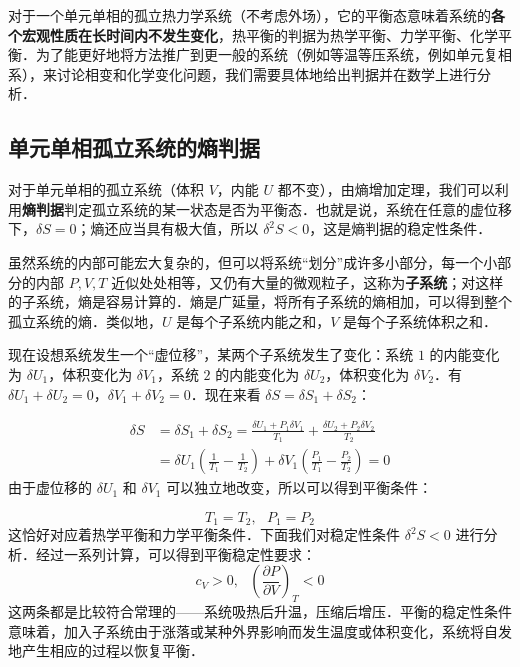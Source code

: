 
对于一个单元单相的孤立热力学系统（不考虑外场），它的平衡态意味着系统的\textbf{各个宏观性质在长时间内不发生变化}，热平衡的判据为热学平衡、力学平衡、化学平衡．为了能更好地将方法推广到更一般的系统（例如等温等压系统，例如单元复相系），来讨论相变和化学变化问题，我们需要具体地给出判据并在数学上进行分析．

\subsection{单元单相孤立系统的熵判据}

对于单元单相的孤立系统（体积 $V$，内能 $U$ 都不变），由熵增加定理，我们可以利用\textbf{熵判据}判定孤立系统的某一状态是否为平衡态．也就是说，系统在任意的虚位移下，$\delta S=0$；熵还应当具有极大值，所以 $\delta^2S<0$，这是熵判据的稳定性条件．

虽然系统的内部可能宏大复杂的，但可以将系统“划分”成许多小部分，每一个小部分的内部 $P,V,T$ 近似处处相等，又仍有大量的微观粒子，这称为\textbf{子系统}；对这样的子系统，熵是容易计算的．熵是广延量，将所有子系统的熵相加，可以得到整个孤立系统的熵．类似地，$U$ 是每个子系统内能之和，$V$ 是每个子系统体积之和．

现在设想系统发生一个“虚位移”，某两个子系统发生了变化：系统 $1$ 的内能变化为 $\delta U_1$，体积变化为 $\delta V_1$，系统 $2$ 的内能变化为 $\delta U_2$，体积变化为 $\delta V_2$．有 $\delta U_1+\delta U_2=0$，$\delta V_1+\delta V_2=0$．现在来看 $\delta S=\delta S_1+\delta S_2$：

\begin{align}
\delta S&=\delta S_1+\delta S_2=\frac{\delta U_1+P_1\delta V_1}{T_1}+\frac{\delta U_2+P_2\delta V_2}{T_2}
\\
&=\delta U_1\left(\frac{1}{T_1}-\frac{1}{T_2}\right)
+\delta V_1\left(\frac{P_1}{T_1}-\frac{P_2}{T_2}\right)=0
\end{align}
由于虚位移的 $\delta U_1$ 和 $\delta V_1$ 可以独立地改变，所以可以得到平衡条件：

\begin{equation}
T_1=T_2,\ \ \ P_1=P_2
\end{equation}
这恰好对应着热学平衡和力学平衡条件．下面我们对稳定性条件 $\delta^2 S<0$ 进行分析．经过一系列计算，可以得到平衡稳定性要求：
\begin{equation}
c_V>0,\ \ \ \left(\frac{\partial P}{\partial V}\right)_T<0
\end{equation}
这两条都是比较符合常理的——系统吸热后升温，压缩后增压．平衡的稳定性条件意味着，加入子系统由于涨落或某种外界影响而发生温度或体积变化，系统将自发地产生相应的过程以恢复平衡．